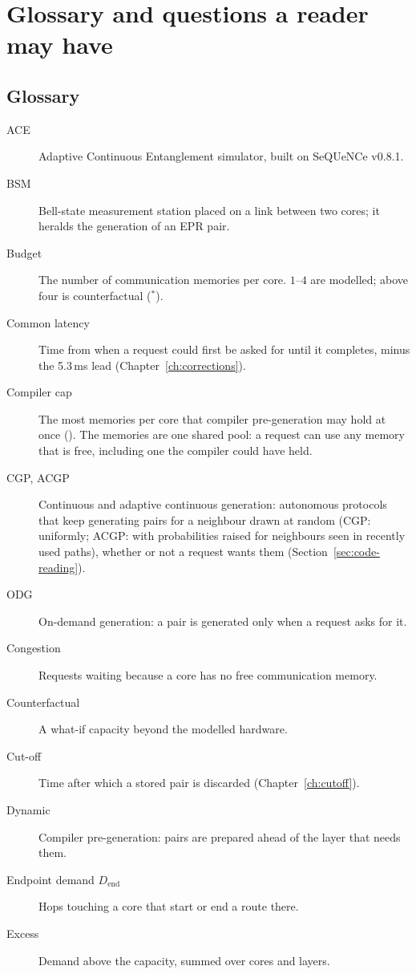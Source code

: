 \chapter{Glossary and questions a reader may have}
\label{app:glossary}

\section{Glossary}
\begin{description}
  \item[ACE] Adaptive Continuous Entanglement simulator, built on SeQUeNCe v0.8.1.
  \item[BSM] Bell-state measurement station placed on a link between two cores; it heralds the generation of an EPR pair.
  \item[Budget] The number of communication memories per core. $1$--$4$ are modelled; above four is counterfactual ($^*$).
  \item[Common latency] Time from when a request could first be asked for until it completes, minus the 5.3\,ms lead (Chapter~\ref{ch:corrections}).
  \item[Compiler cap] The most memories per core that compiler pre-generation may hold at once (). The memories are one shared pool: a request can use any memory that is free, including one the compiler could have held.
  \item[CGP, ACGP] Continuous and adaptive continuous generation: autonomous protocols that keep generating pairs for a neighbour drawn at random (CGP: uniformly; ACGP: with probabilities raised for neighbours seen in recently used paths), whether or not a request wants them (Section~\ref{sec:code-reading}).
  \item[ODG] On-demand generation: a pair is generated only when a request asks for it.
  \item[Congestion] Requests waiting because a core has no free communication memory.
  \item[Counterfactual] A what-if capacity beyond the modelled hardware.
  \item[Cut-off] Time after which a stored pair is discarded (Chapter~\ref{ch:cutoff}).
  \item[Dynamic] Compiler pre-generation: pairs are prepared ahead of the layer that needs them.
  \item[Endpoint demand $D_{\mathrm{end}}$] Hops touching a core that start or end a route there.
  \item[Excess] Demand above the capacity, summed over cores and layers.

\end{description}
